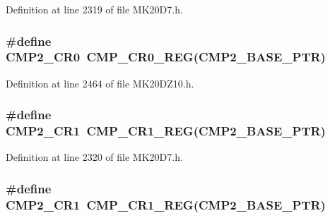 Definition at line 2319 of file M\+K20\+D7.\+h.

\subsubsection[{\texorpdfstring{C\+M\+P2\+\_\+\+C\+R0}{CMP2_CR0}}]{\setlength{\rightskip}{0pt plus 5cm}\#define C\+M\+P2\+\_\+\+C\+R0~{\bf C\+M\+P\+\_\+\+C\+R0\+\_\+\+R\+EG}({\bf C\+M\+P2\+\_\+\+B\+A\+S\+E\+\_\+\+P\+TR})}\hypertarget{group___c_m_p___register___accessor___macros_ga032f709b685f855d5110183cf53f79ed}{}\label{group___c_m_p___register___accessor___macros_ga032f709b685f855d5110183cf53f79ed}


Definition at line 2464 of file M\+K20\+D\+Z10.\+h.

\subsubsection[{\texorpdfstring{C\+M\+P2\+\_\+\+C\+R1}{CMP2_CR1}}]{\setlength{\rightskip}{0pt plus 5cm}\#define C\+M\+P2\+\_\+\+C\+R1~{\bf C\+M\+P\+\_\+\+C\+R1\+\_\+\+R\+EG}({\bf C\+M\+P2\+\_\+\+B\+A\+S\+E\+\_\+\+P\+TR})}\hypertarget{group___c_m_p___register___accessor___macros_ga6602afca3ec770ad939669ccd0df316c}{}\label{group___c_m_p___register___accessor___macros_ga6602afca3ec770ad939669ccd0df316c}


Definition at line 2320 of file M\+K20\+D7.\+h.

\subsubsection[{\texorpdfstring{C\+M\+P2\+\_\+\+C\+R1}{CMP2_CR1}}]{\setlength{\rightskip}{0pt plus 5cm}\#define C\+M\+P2\+\_\+\+C\+R1~{\bf C\+M\+P\+\_\+\+C\+R1\+\_\+\+R\+EG}({\bf C\+M\+P2\+\_\+\+B\+A\+S\+E\+\_\+\+P\+TR})}\hypertarget{group___c_m_p___register___accessor___macros_ga6602afca3ec770ad939669ccd0df316c}{}\label{group___c_m_p___register___accessor___macros_ga6602afca3ec770ad939669ccd0df316c}


